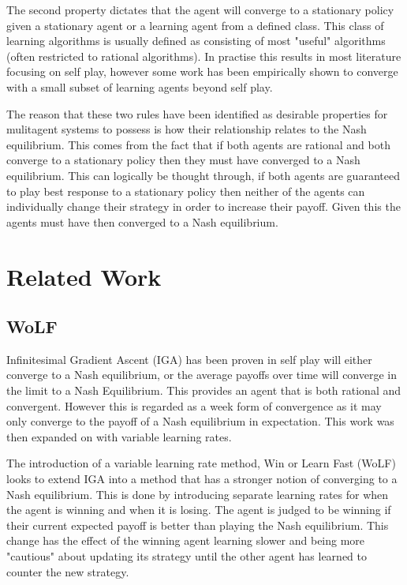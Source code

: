 \documentclass[conference]{IEEEtran}
\begin{document}
The second property dictates that the agent will converge to a stationary policy given 
a stationary agent or a learning agent from a defined class. This class of learning
algorithms is usually defined as consisting of most "useful" algorithms (often restricted
to rational algorithms). In practise this results in most literature focusing on self 
play, however some work has been empirically shown to converge with a small subset of learning 
agents beyond self play. 

The reason that these two rules have been identified as desirable properties for mulitagent
systems to possess is how their relationship relates to the Nash equilibrium. This comes from 
the fact that if both agents are rational and both converge to a stationary policy then they
must have converged to a Nash equilibrium. This can logically be thought through, if both 
agents are guaranteed to play best response to a stationary policy then neither of the agents 
can individually change their strategy in order to increase their payoff. Given this the agents 
must have then converged to a Nash equilibrium.

\section{Related Work}

\subsection{WoLF}

Infinitesimal Gradient Ascent (IGA) has been proven in self play will either converge to a Nash equilibrium,
or the average payoffs over time will converge in the limit to a Nash Equilibrium. This provides an agent
that is both rational and convergent. However this is regarded as a week form of convergence as it may only
converge to the payoff of a Nash equilibrium in expectation. This work was then expanded on with variable
learning rates.

The introduction of a variable learning rate method, Win or Learn Fast (WoLF) looks to extend IGA into a
method that has a stronger notion of converging to a Nash equilibrium. This is done by introducing separate
learning rates for when the agent is winning and when it is losing. The agent is judged to be winning if their
current expected payoff is better than playing the Nash equilibrium. This change has the effect of the winning
agent learning slower and being more "cautious" about updating its strategy until the other agent has learned 
to counter the new strategy.
\end{document}
